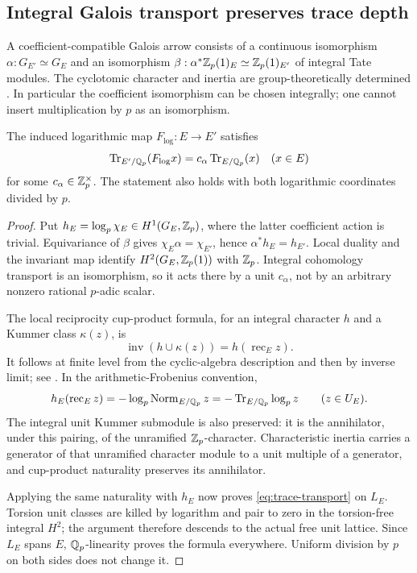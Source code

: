 \subsection{Integral Galois transport preserves trace depth}

A coefficient-compatible Galois arrow consists of a continuous
isomorphism $\alpha:G_{E'}\simeq G_E$ and an isomorphism
$\beta:\alpha^*\mathbb Z_p(1)_E\simeq\mathbb Z_p(1)_{E'}$ of integral Tate modules.
The cyclotomic character and inertia are group-theoretically determined
\cite[Propositions~1.1--1.2 and Corollary~1.3]{MochLocal}.
In particular the coefficient isomorphism can be chosen integrally;
one cannot insert multiplication by $p$ as an isomorphism.

\begin{proposition}\label{prop:trace-transport}
The induced logarithmic map $F_{\log}:E\longrightarrow E'$ satisfies
\begin{equation}\label{eq:trace-transport}
 \operatorname{Tr}_{E'/\mathbb Q_p}(F_{\log}x)
       =c_\alpha\operatorname{Tr}_{E/\mathbb Q_p}(x)
 \quad(x\in E)
\end{equation}
for some $c_\alpha\in\mathbb Z_p^\times$. The statement also holds with both
logarithmic coordinates divided by $p$.
\end{proposition}
\begin{proof}
Put $h_E=\log_p\chi_E\in H^1(G_E,\mathbb Z_p)$, where the latter coefficient
action is trivial. Equivariance of $\beta$ gives
$\chi_E\alpha=\chi_{E'}$, hence $\alpha^*h_E=h_{E'}$.
Local duality and the invariant map identify
$H^2(G_E,\mathbb Z_p(1))$ with $\mathbb Z_p$. Integral cohomology transport is an
isomorphism, so it acts there by a unit $c_\alpha$, not by an arbitrary
nonzero rational $p$-adic scalar.

The local reciprocity cup-product formula, for an integral character $h$
and a Kummer class $\kappa(z)$, is
\[
 \operatorname{inv}(h\mathbin\cup\kappa(z))=h(\operatorname{rec}_E z).
\]
It follows at finite level from the cyclic-algebra description and then
by inverse limit; see \cite[Chapter~III, Proposition~3.6 and \S4]{MilneCFT}.
In the arithmetic-Frobenius convention,
\[
 h_E(\operatorname{rec}_E z)
   =-\log_p\operatorname{Norm}_{E/\mathbb Q_p}z
   =-\operatorname{Tr}_{E/\mathbb Q_p}\log_p z
 \qquad(z\in U_E).
\]
The integral unit Kummer submodule is also preserved: it is the
annihilator, under this pairing, of the unramified $\mathbb Z_p$-character.
Characteristic inertia carries a generator of that unramified
character module to a unit multiple of a generator, and cup-product
naturality preserves its annihilator.

Applying the same naturality with $h_E$ now proves
\eqref{eq:trace-transport} on $L_E$. Torsion unit classes are killed
by logarithm and pair to zero in the torsion-free integral $H^2$;
the argument therefore descends to the actual free unit lattice.
Since $L_E$ spans $E$, $\mathbb Q_p$-linearity proves the formula everywhere.
Uniform division by $p$ on both sides does not change it.
\end{proof}

